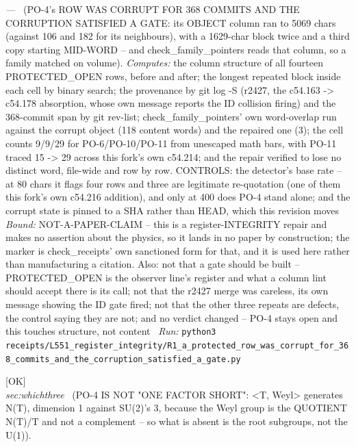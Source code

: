 \begin{description}
\textit{---} \ (PO-4's ROW WAS CORRUPT FOR 368 COMMITS AND THE CORRUPTION SATISFIED A GATE: its OBJECT column ran to 5069 chars (against 106 and 182 for its neighbours), with a 1629-char block twice and a third copy starting MID-WORD -- and check\_family\_pointers reads that column, so a family matched on volume). 
\emph{Computes:} the column structure of all fourteen PROTECTED\_OPEN rows, before and after; the longest repeated block inside each cell by binary search; the provenance by git log -S (r2427, the c54.163 -> c54.178 absorption, whose own message reports the ID collision firing) and the 368-commit span by git rev-list; check\_family\_pointers' own word-overlap run against the corrupt object (118 content words) and the repaired one (3); the cell counts 9/9/29 for PO-6/PO-10/PO-11 from unescaped math bars, with PO-11 traced 15 -> 29 across this fork's own c54.214; and the repair verified to lose no distinct word, file-wide and row by row. CONTROLS: the detector's base rate -- at 80 chars it flags four rows and three are legitimate re-quotation (one of them this fork's own c54.216 addition), and only at 400 does PO-4 stand alone; and the corrupt state is pinned to a SHA rather than HEAD, which this revision moves
 \emph{Bound:} NOT-A-PAPER-CLAIM -- this is a register-INTEGRITY repair and makes no assertion about the physics, so it lands in no paper by construction; the marker is check\_receipts' own sanctioned form for that, and it is used here rather than manufacturing a citation. Also: not that a gate should be built -- PROTECTED\_OPEN is the observer line's register and what a column lint should accept there is its call; not that the r2427 merge was careless, its own message showing the ID gate fired; not that the other three repeats are defects, the control saying they are not; and no verdict changed -- PO-4 stays open and this touches structure, not content
\ \emph{Run:} \texttt{python3 receipts/L551\_register\_integrity/R1\_a\_protected\_row\_was\_corrupt\_for\_368\_commits\_and\_the\_corruption\_satisfied\_a\_gate.py}
\item[\label{rcpt:W1_the_weyl_group_is_a_quotient_not_a_complement_so_the_row_is_two_dimensions_short}\texttt{W1\_the\_weyl\_group\_is\_a\_quotient\_not\_a\_complement\_so\_the\_row\_is\_two\_dimensions\_short}]\hfill\textsf{[OK]}\\
\textit{sec:whichthree} \ (PO-4 IS NOT "ONE FACTOR SHORT": <T, Weyl> generates N(T), dimension 1 against SU(2)'s 3, because the Weyl group is the QUOTIENT N(T)/T and not a complement -- so what is absent is the root subgroups, not the U(1)). 

\end{description}
